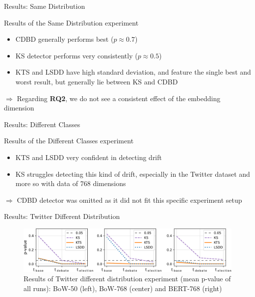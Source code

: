 \documentclass{beamer} %
\begin{document}
	\begin{frame}{Results: Same Distribution}
		\begin{alertblock}{Results of the Same Distribution experiment}
			\begin{itemize}
				\item CDBD generally performs best ($p \approx 0.7$)
				\item KS detector performs very consistently ($p \approx 0.5$)
				\item KTS and LSDD have high standard deviation, and feature the single best and worst result, but generally lie between KS and CDBD
			\end{itemize}
		\end{alertblock}
		$\Rightarrow$ Regarding \alert{\textbf{RQ2}}, we do not see a consistent effect of the
		embedding dimension
	\end{frame}
	
	\begin{frame}{Results: Different Classes}
		\begin{alertblock}{Results of the Different Classes experiment}
			\begin{itemize}
				\item KTS and LSDD very confident in detecting drift
				\item KS struggles detecting this kind of drift, especially in the Twitter dataset and more so with data of 768 dimensions 
			\end{itemize}
		\end{alertblock}
		$\Rightarrow$ CDBD detector was omitted as it did not fit this specific experiment setup
	\end{frame}
	
	\begin{frame}{Results: Twitter Different Distribution}
		\begin{figure}[htb!] %
			\centering
			\includegraphics[width=\textwidth]{Bilder/diff_dist_all}
			\caption{Results of Twitter different distribution experiment (mean p-value of all runs):
				BoW-50 (left), BoW-768 (center) and BERT-768 (right)}
			\label{Fig:diff_dist_all}
		\end{figure}
	\end{frame}
\end{document}
